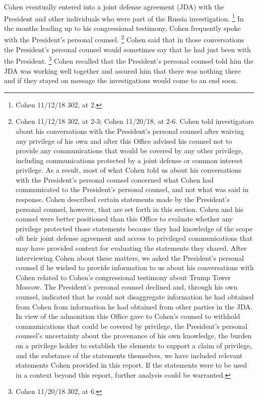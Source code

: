 {Cohen eventually entered into a joint defense agreement (JDA) with the President and other individuals who were part of the Russia investigation.%
\footnote{Cohen 11/12/18 302, at 2.}
In the months leading up to his congressional testimony, Cohen frequently spoke with the President's personal counsel.%
\footnote{Cohen 11/12/18 302, at 2-3;
Cohen 11/20/18, at 2-6.
Cohen told investigators about his conversations with the President’s personal counsel after waiving any privilege of his own and after this Office advised his counsel not to provide any communications that would be covered by any other privilege, including communications protected by a joint defense or common interest privilege.
As a result, most of what Cohen told us about his conversations with the President’s personal counsel concerned what Cohen had communicated to the President’s personal counsel, and not what was said in response.
Cohen described certain statements made by the President’s personal counsel, however, that are set forth in this section.
Cohen and his counsel were better positioned than this Office to evaluate whether any privilege protected those statements because they had knowledge of the scope oft heir joint defense agreement and access to privileged communications that may have provided context for evaluating the statements they shared.
After interviewing Cohen about these matters, we asked the President’s personal counsel if he wished to provide information to us about his conversations with Cohen related to Cohen’s congressional testimony about Trump Tower Moscow.
The President’s personal counsel declined and, through his own counsel, indicated that he could not disaggregate information he had obtained from Cohen from information he had obtained from other parties in the JDA.
In view of the admonition this Office gave to Cohen’s counsel to withhold communications that could be covered by privilege, the President’s personal counsel’s uncertainty about the provenance of his own knowledge, the burden on a privilege holder to establish the elements to support a claim of privilege, and the substance of the statements themselves, we have included relevant statements Cohen provided in this report.
If the statements were to be used in a context beyond this report, further analysis could be warranted.}
Cohen said that in those conversations the President's personal counsel would sometimes say that he had just been with the President.%
\footnote{Cohen 11/20/18 302, at 6.}
Cohen recalled that the President's personal counsel told him the JDA was working well together and assured him that there was nothing there and if they stayed on message the investigations would come to an end soon.%
}
